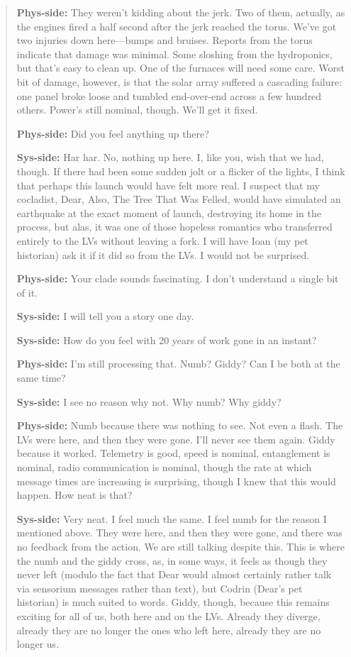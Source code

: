 \begin{quote}
\textbf{Phys-side:} They weren't kidding about the jerk. Two of them, actually, as the engines fired a half second after the jerk reached the torus. We've got two injuries down here---bumps and bruises. Reports from the torus indicate that damage was minimal. Some sloshing from the hydroponics, but that's easy to clean up. One of the furnaces will need some care. Worst bit of damage, however, is that the solar array suffered a cascading failure: one panel broke loose and tumbled end-over-end across a few hundred others. Power's still nominal, though. We'll get it fixed.

\textbf{Phys-side:} Did you feel anything up there?

\textbf{Sys-side:} Har har. No, nothing up here. I, like you, wish that we had, though. If there had been some sudden jolt or a flicker of the lights, I think that perhaps this launch would have felt more real. I suspect that my cocladist, Dear, Also, The Tree That Was Felled, would have simulated an earthquake at the exact moment of launch, destroying its home in the process, but alas, it was one of those hopeless romantics who transferred entirely to the LVs without leaving a fork. I will have Ioan (my pet historian) ask it if it did so from the LVs. I would not be surprised.

\textbf{Phys-side:} Your clade sounds fascinating. I don't understand a single bit of it.

\textbf{Sys-side:} I will tell you a story one day.

\textbf{Sys-side:} How do you feel with 20 years of work gone in an instant?

\textbf{Phys-side:} I'm still processing that. Numb? Giddy? Can I be both at the same time?

\textbf{Sys-side:} I see no reason why not. Why numb? Why giddy?

\textbf{Phys-side:} Numb because there was nothing to see. Not even a flash. The LVs were here, and then they were gone. I'll never see them again. Giddy because it worked. Telemetry is good, speed is nominal, entanglement is nominal, radio communication is nominal, though the rate at which message times are increasing is surprising, though I knew that this would happen. How neat is that?

\textbf{Sys-side:} Very neat. I feel much the same. I feel numb for the reason I mentioned above. They were here, and then they were gone, and there was no feedback from the action. We are still talking despite this. This is where the numb and the giddy cross, as, in some ways, it feels as though they never left (modulo the fact that Dear would almost certainly rather talk via sensorium messages rather than text), but Codrin (Dear's pet historian) is much suited to words. Giddy, though, because this remains exciting for all of us, both here and on the LVs. Already they diverge, already they are no longer the ones who left here, already they are no longer us.


\end{quote}
